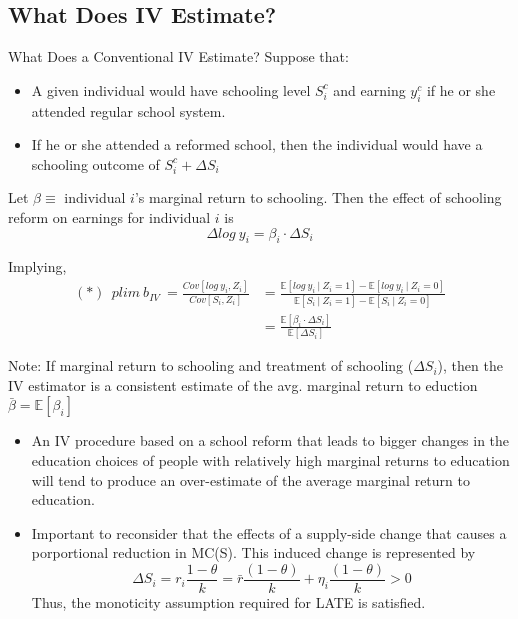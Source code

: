 \documentclass{beamer}
\begin{document}
\subsection{What Does IV Estimate?}
\begin{frame}{What Does a Conventional IV Estimate?}
Suppose that: 
\begin{itemize}
    \item A given individual would have schooling level $S_{i}^{c}$ and earning $y_{i}^{c}$ if he or she attended regular school system. 
    \item If he or she attended a reformed school, then the individual would have a schooling outcome of $S_{i}^{c} + \Delta S_{i}$
\end{itemize}

Let $\beta \equiv$ individual $i$'s marginal return to schooling. Then the effect of schooling reform on earnings for individual $i$ is
\begin{equation*}
    \Delta log~y_{i}= \beta_{i}\cdot \Delta S_{i}
\end{equation*}

Implying, 
\begin{align*}
   (\ast)~~ plim~b_{IV}~= \frac{Cov[log~y_{i},Z_{i}]}{Cov[S_{i},Z_{i}]} & = \frac{\mathbb{E}[log~y_i~|~Z_{i}=1]-\mathbb{E}[log~y_{i}~|~Z_{i}=0]}{\mathbb{E}[S_{i}~|~Z_{i}=1]-\mathbb{E}[S_{i}~|~Z_{i}=0]}\\
    & = \frac{\mathbb{E}[\beta_{i}\cdot \Delta S_{i}]}{\mathbb{E}[\Delta S_{i}]}
\end{align*}
\end{frame}

\begin{frame}{}
\begin{block}{Note: }
If marginal return to schooling and treatment of schooling ($\Delta S_{i}$), then the IV estimator is a consistent estimate of the avg. marginal return to eduction $\bar{\beta}=\mathbb{E}[\beta_{i}]$
\end{block}

\begin{itemize}
    \item An IV procedure based on a school reform that leads to bigger changes in the education choices of people with relatively high marginal returns to education will tend to produce an over-estimate of the average marginal return to education.
    \item Important to reconsider that the effects of a supply-side change that causes a porportional reduction in MC(S). This induced change is represented by
    \begin{equation*}
        \Delta S_{i}= r_{i}\frac{1-\theta}{k}= \bar{r}\frac{(1-\theta)}{k} + \eta_{i}\frac{(1-\theta)}{k}>0
    \end{equation*}
    Thus, the monoticity assumption required for LATE is satisfied. 
\end{itemize}   
    
\end{frame}
\end{document}
